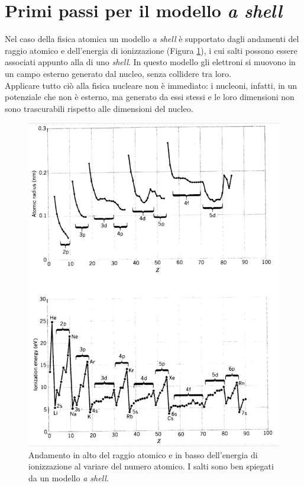 \section{Primi passi per il modello \textit{a shell}}
Nel caso della fisica atomica un modello \textit{a shell} è supportato dagli andamenti del raggio atomico e dell'energia di ionizzazione (Figura \ref{0301_rE}), i cui salti possono essere associati  appunto alla  di uno \textit{shell}. In questo modello gli elettroni si muovono in un campo esterno generato dal nucleo, senza collidere tra loro.\\
Applicare tutto ciò alla fisica nucleare non è immediato: i nucleoni, infatti,  in un potenziale che non è esterno, ma generato da essi stessi e le loro dimensioni non sono trascurabili rispetto alle dimensioni del nucleo.
\begin{figure}[!h]
    \centering
    \includegraphics[scale=0.2]{Immagini/ratm-Eion.png}
    \caption{Andamento in alto del raggio atomico e in basso dell'energia di ionizzazione al variare del numero atomico. I salti sono ben spiegati da un modello \textit{a shell}.}
    \label{0301_rE}
\end{figure}
